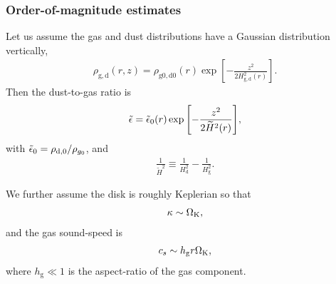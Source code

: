 



\subsubsection{Order-of-magnitude estimates}
Let us assume the gas and dust distributions have a Gaussian
distribution vertically,
\begin{align}
  \rho_\mathrm{g,d}(r,z) = \rho_\mathrm{g0,d0}(r) \exp
      {\left[-\frac{z^2}{2H^2_\mathrm{g,d}(r)}\right]}.
\end{align}
Then the dust-to-gas ratio is 
\begin{align}
  \tilde{\epsilon} = \tilde{\epsilon}_0(r)
  \exp{\left[-\frac{z^2}{2\widetilde{H}^2(r)}\right]}, 
\end{align}
with $\tilde{\epsilon}_0= \rho_\mathrm{d,0}/\rho_{g_0}$, and  
\begin{align}
  \frac{1}{\widetilde{H}^2} \equiv \frac{1}{H_\mathrm{d}^2} -
  \frac{1}{H_\mathrm{g}^2}. 
\end{align}

We further assume
the disk is roughly Keplerian so that
\begin{align}
  \kappa \sim \Omega_{\rm K}, 
\end{align}
and the gas sound-speed is 
\begin{align}
  c_s \sim h_\mathrm{g}r\Omega_{\rm K}, 
\end{align}
where $h_\mathrm{g}\ll1$ is the aspect-ratio of the gas component. 








